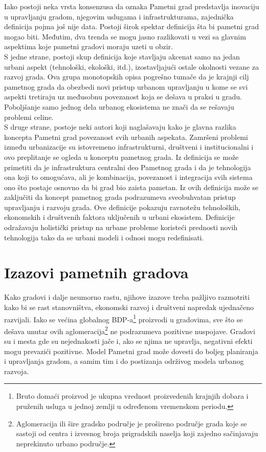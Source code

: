 \documentclass[a4paper,12pt]{article}
\begin{document}
{Iako postoji neka vrsta konsenzusa da oznaka Pametni grad predstavlja inovaciju u upravljanju gradom, njegovim uslugama i infrastrukturama, zajednička definicija pojma još nije data. Postoji širok spektar definicija šta bi pametni grad mogao biti. Međutim, dva trenda se mogu jasno razlikovati u vezi sa glavnim aspektima koje pametni gradovi moraju uzeti u obzir. \\

S jedne strane, postoji skup definicija koje stavljaju akcenat samo na jedan urbani aspekt (tehnološki, ekološki, itd.), izostavljajući ostale okolnosti vezane za razvoj grada. Ova grupa monotopskih opisa pogrešno tumače da je krajnji cilj pametnog grada da obezbedi novi pristup urbanom upravljanju u kome se svi aspekti tretiraju uz međusobnu povezanost koja se dešava u praksi u gradu. Poboljšanje samo jednog dela urbanog ekosistema ne znači da se rešavaju problemi celine. \\

S druge strane, postoje neki autori koji naglašavaju kako je glavna razlika koncepta Pametni grad povezanost svih urbanih aspekata. Zamršeni problemi između urbanizacije su istovremeno infrastrukturni, društveni i institucionalni i ovo preplitanje se ogleda u konceptu pametnog grada. Iz definicija se može primetiti da je infrastruktura centralni deo Pametnog grada i da je tehnologija ona koji to omogućava, ali je kombinacija, povezanost i integracija svih sistema ono što postaje osnovno da bi grad bio zaista pametan. Iz ovih definicija može se zaključiti da koncept pametnog grada podrazumeva sveobuhvatan pristup upravljanju i razvoju grada. Ove definicije pokazuju ravnotežu tehnoloških, ekonomskih i društvenih faktora uključenih u urbani ekosistem. Definicije odražavaju holistički pristup na urbane probleme koristeći prednosti novih tehnologija tako da se urbani modeli i odnosi mogu redefinisati.\cite{referenca3}\\




\section{Izazovi pametnih gradova}	
\label{sec:termini_i_citiranje}


 Kako gradovi i dalje neumorno rastu, njihove izazove treba pažljivo razmotriti kako bi se rast stanovništva, ekonomski razvoj i društveni napredak ujednačeno razvijali. Iako se većina globalnog BDP-a\footnote{Bruto domaći proizvod je ukupna vrednost proizvedenih krajnjih dobara i pruženih usluga u jednoj zemlji u određenom vremenskom periodu. } proizvodi u gradovima, sve što se dešava unutar ovih aglomeracija\footnote{Aglomeracija ili šire gradsko područje je prošireno područje grada koje se sastoji od centra i izvesnog broja prigradskih naselja koji zajedno sačinjavaju neprekinuto urbano područje.
} ne podrazumeva pozitivne nuspojave. Gradovi su i mesta gde su nejednakosti jače i, ako se njima ne upravlja, negativni efekti mogu prevazići pozitivne. Model Pametni grad može dovesti do boljeg planiranja i upravljanja gradom, a samim tim i do postizanja održivog modela urbanog razvoja. \\

}
\end{document}
